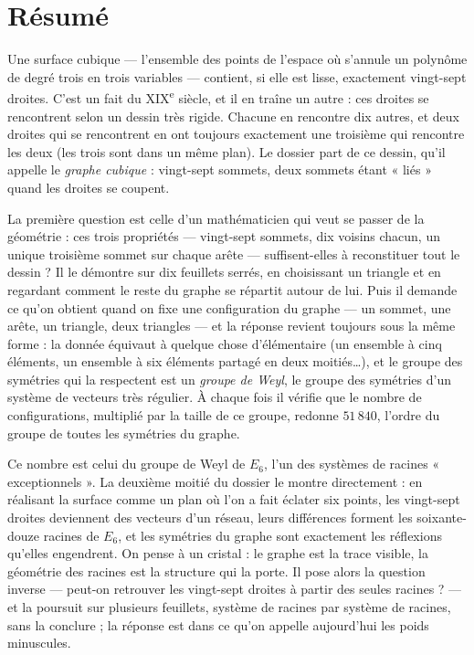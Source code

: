 \documentclass[11pt,a4paper]{article}
\begin{document}
\section*{Résumé}

\begin{resume}
Une surface cubique --- l'ensemble des points de l'espace où s'annule un
polynôme de degré trois en trois variables --- contient, si elle est lisse,
exactement vingt-sept droites. C'est un fait du XIX\textsuperscript{e}
siècle, et il en traîne un autre : ces droites se rencontrent selon un dessin
très rigide. Chacune en rencontre dix autres, et deux droites qui se
rencontrent en ont toujours exactement une troisième qui rencontre les deux
(les trois sont dans un même plan). Le dossier part de ce dessin, qu'il
appelle le \emph{graphe cubique} : vingt-sept sommets, deux sommets étant
« liés » quand les droites se coupent.

La première question est celle d'un mathématicien qui veut se passer de la
géométrie : ces trois propriétés --- vingt-sept sommets, dix voisins
chacun, un unique troisième sommet sur chaque arête --- suffisent-elles à
reconstituer tout le dessin ? Il le démontre sur dix feuillets serrés, en
choisissant un triangle et en regardant comment le reste du graphe se répartit
autour de lui. Puis il demande ce qu'on obtient quand on fixe une
configuration du graphe --- un sommet, une arête, un triangle, deux triangles
--- et la réponse revient toujours sous la même forme : la donnée équivaut à
quelque chose d'élémentaire (un ensemble à cinq éléments, un ensemble à six
éléments partagé en deux moitiés\ldots), et le groupe des symétries qui la
respectent est un \emph{groupe de Weyl}, le groupe des symétries d'un système
de vecteurs très régulier. À chaque fois il vérifie que le nombre de
configurations, multiplié par la taille de ce groupe, redonne
$51\,840$, l'ordre du groupe de toutes les symétries du graphe.

Ce nombre est celui du groupe de Weyl de $E_6$, l'un des systèmes de racines
« exceptionnels ». La deuxième moitié du dossier le montre directement : en
réalisant la surface comme un plan où l'on a fait éclater six points, les
vingt-sept droites deviennent des vecteurs d'un réseau, leurs différences
forment les soixante-douze racines de $E_6$, et les symétries du graphe sont
exactement les réflexions qu'elles engendrent. On pense à un cristal : le
graphe est la trace visible, la géométrie des racines est la structure qui la
porte. Il pose alors la question inverse --- peut-on retrouver les
vingt-sept droites à partir des seules racines ? --- et la poursuit sur
plusieurs feuillets, système de racines par système de racines, sans la
conclure ; la réponse est dans ce qu'on appelle aujourd'hui les poids
minuscules.


\end{resume}
\end{document}
